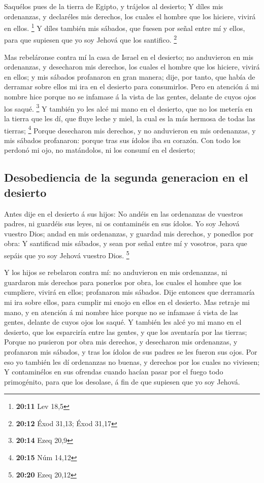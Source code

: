  Saquélos pues de la tierra de Egipto, y trájelos al
desierto;  Y díles mis ordenanzas, y declaréles mis
derechos, los cuales el hombre que los hiciere, vivirá en ellos.
\footnote{\textbf{20:11} Lev 18,5}  Y díles también mis
sábados, que fuesen por señal entre mí y ellos, para que supiesen que yo
soy Jehová que los santifico. \footnote{\textbf{20:12} Éxod 31,13; Éxod
  31,17}

 Mas rebeláronse contra mí la casa de Israel en el
desierto; no anduvieron en mis ordenanzas, y desecharon mis derechos,
los cuales el hombre que los hiciere, vivirá en ellos; y mis sábados
profanaron en gran manera; dije, por tanto, que había de derramar sobre
ellos mi ira en el desierto para consumirlos.  Pero en
atención á mi nombre hice porque no se infamase á la vista de las
gentes, delante de cuyos ojos los saqué. \footnote{\textbf{20:14} Ezeq
  20,9}  Y también yo les alcé mi mano en el desierto, que
no los metería en la tierra que les dí, que fluye leche y miel, la cual
es la más hermosa de todas las tierras; \footnote{\textbf{20:15} Núm
  14,12}  Porque desecharon mis derechos, y no anduvieron
en mis ordenanzas, y mis sábados profanaron: porque tras sus ídolos iba
su corazón.  Con todo los perdonó mi ojo, no matándolos, ni
los consumí en el desierto;

\hypertarget{desobediencia-de-la-segunda-generacion-en-el-desierto}{%
\subsection{Desobediencia de la segunda generacion en el
desierto}\label{desobediencia-de-la-segunda-generacion-en-el-desierto}}

 Antes dije en el desierto á sus hijos: No andéis en las
ordenanzas de vuestros padres, ni guardéis sus leyes, ni os contaminéis
en sus ídolos.  Yo soy Jehová vuestro Dios; andad en mis
ordenanzas, y guardad mis derechos, y ponedlos por obra:  Y
santificad mis sábados, y sean por señal entre mí y vosotros, para que
sepáis que yo soy Jehová vuestro Dios. \footnote{\textbf{20:20} Ezeq
  20,12}

 Y los hijos se rebelaron contra mí: no anduvieron en mis
ordenanzas, ni guardaron mis derechos para ponerlos por obra, los cuales
el hombre que los cumpliere, vivirá en ellos; profanaron mis sábados.
Dije entonces que derramaría mi ira sobre ellos, para cumplir mi enojo
en ellos en el desierto.  Mas retraje mi mano, y en
atención á mi nombre hice porque no se infamase á vista de las gentes,
delante de cuyos ojos los saqué.  Y también les alcé yo mi
mano en el desierto, que los esparciría entre las gentes, y que los
aventaría por las tierras;  Porque no pusieron por obra mis
derechos, y desecharon mis ordenanzas, y profanaron mis sábados, y tras
los ídolos de sus padres se les fueron sus ojos.  Por eso
yo también les dí ordenanzas no buenas, y derechos por los cuales no
viviesen;  Y contaminélos en sus ofrendas cuando hacían
pasar por el fuego todo primogénito, para que los desolase, á fin de que
supiesen que yo soy Jehová.

